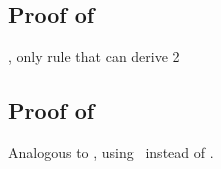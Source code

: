 


\subsection*{Proof of }

\begin{derivation}
     {\premof{\Rcxodec}, only rule that can derive 2}
\end{derivation}



\subsection*{Proof of }

Analogous to , using \Rcxtdef\ instead of \Rcxodec.




